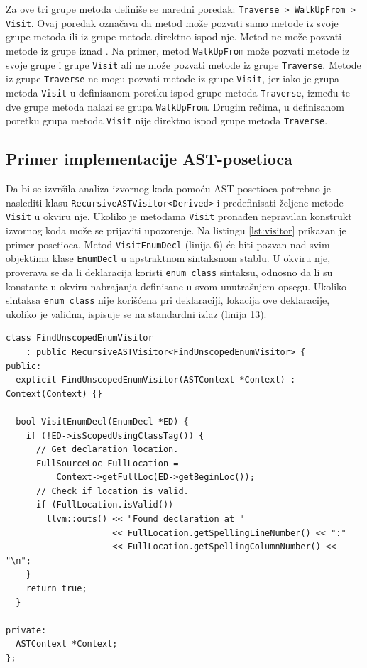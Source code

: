 \documentclass[12pt,oneside]{memoir}
\begin{document}
Za ove tri grupe metoda defini\v{s}e se naredni poredak: \texttt{Traverse > WalkUpFrom > Visit}. Ovaj poredak ozna\v{c}ava da metod mo\v{z}e pozvati samo metode iz svoje grupe metoda ili iz grupe metoda direktno ispod nje. Metod ne mo\v{z}e pozvati metode iz grupe iznad \cite{visitors}. Na primer, metod \texttt{WalkUpFrom} mo\v{z}e pozvati metode iz svoje grupe i grupe \texttt{Visit} ali 
ne mo\v{z}e pozvati metode iz grupe \texttt{Traverse}. Metode iz grupe \texttt{Traverse} ne mogu pozvati metode iz grupe \texttt{Visit}, jer iako je grupa metoda \texttt{Visit} u definisanom poretku ispod grupe metoda \texttt{Traverse}, između te dve grupe metoda nalazi se grupa \texttt{WalkUpFrom}.
Drugim re\v{c}ima, u definisanom poretku grupa metoda \texttt{Visit} nije direktno ispod grupe metoda \texttt{Traverse}.

\subsection{Primer implementacije AST-posetioca}
Da bi se izvršila analiza izvornog koda pomoću AST-posetioca potrebno je naslediti klasu 
 \texttt{RecursiveASTVisitor<Derived>} i predefinisati željene metode \texttt{Visit} u okviru nje. Ukoliko je metodama \texttt{Visit} pronađen nepravilan konstrukt izvornog koda mo\v{z}e se prijaviti upozorenje. Na listingu \ref{lst:visitor} prikazan je primer posetioca. Metod \texttt{VisitEnumDecl} (linija 6) \'c{e} biti pozvan nad svim objektima klase \texttt{EnumDecl} u apstraktnom sintaksnom stablu. U okviru nje, proverava se da li deklaracija koristi \texttt{enum class} sintaksu, odnosno da li su konstante u okviru nabrajanja definisane u svom unutra\v{s}njem opsegu. Ukoliko sintaksa \texttt{enum class} nije kori\v{s}\'{c}ena pri deklaraciji, lokacija ove deklaracije, ukoliko je validna, ispisuje se na standardni izlaz (linija 13).

\begin{lstlisting}[style=customc,  caption={Primer posetioca koji pose\'{c}uje sve deklaracije nabrajanja i ispisuje lokaciju onih koji nisu deklarisani sintaksom \texttt{enum class}.},label=lst:visitor]
class FindUnscopedEnumVisitor
    : public RecursiveASTVisitor<FindUnscopedEnumVisitor> {
public:
  explicit FindUnscopedEnumVisitor(ASTContext *Context) : Context(Context) {}

  bool VisitEnumDecl(EnumDecl *ED) {
    if (!ED->isScopedUsingClassTag()) {
      // Get declaration location.
      FullSourceLoc FullLocation =
          Context->getFullLoc(ED->getBeginLoc());
      // Check if location is valid.
      if (FullLocation.isValid())
        llvm::outs() << "Found declaration at "
                     << FullLocation.getSpellingLineNumber() << ":"
                     << FullLocation.getSpellingColumnNumber() << "\n";
    }
    return true;
  }

private:
  ASTContext *Context;
};
\end{lstlisting}
\end{document}
